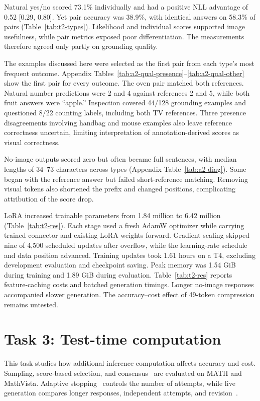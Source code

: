 \documentclass{article}
\begin{document}
Natural yes/no scored 73.1\% individually and had a positive NLL advantage of 0.52 [0.29, 0.80]. Yet pair accuracy was 38.9\%, with identical answers on 58.3\% of pairs (Table~\ref{tab:t2-types}). Likelihood and individual scores supported image usefulness, while pair metrics exposed poor differentiation. The measurements therefore agreed only partly on grounding quality.

The examples discussed here were selected as the first pair from each type's most frequent outcome. Appendix Tables~\ref{tab:a2-qual-presence}--\ref{tab:a2-qual-other} show the first pair for every outcome. The oven pair matched both references. Natural number predictions were 2 and 4 against references 2 and 5, while both fruit answers were ``apple.'' Inspection covered 44/128 grounding examples and questioned 8/22 counting labels, including both TV references. Three presence disagreements involving handbag and mouse examples also leave reference correctness uncertain, limiting interpretation of annotation-derived scores as visual correctness.

No-image outputs scored zero but often became full sentences, with median lengths of 34–73 characters across types (Appendix Table~\ref{tab:a2-diag}). Some began with the reference answer but failed short-reference matching. Removing visual tokens also shortened the prefix and changed positions, complicating attribution of the score drop.

LoRA increased trainable parameters from 1.84 million to 6.42 million (Table~\ref{tab:t2-res}). Each stage used a fresh AdamW optimizer while carrying trained connector and existing LoRA weights forward. Gradient scaling skipped nine of 4,500 scheduled updates after overflow, while the learning-rate schedule and data position advanced. Training updates took 1.61 hours on a T4, excluding development evaluation and checkpoint saving. Peak memory was 1.54 GiB during training and 1.89 GiB during evaluation. Table~\ref{tab:t2-res} reports feature-caching costs and batched generation timings. Longer no-image responses accompanied slower generation. The accuracy–cost effect of 49-token compression remains untested.

\section{Task 3: Test-time computation}
This task studies how additional inference computation affects accuracy and cost. Sampling, score-based selection, and consensus~\citep{wang2022sc} are evaluated on MATH and MathVista. Adaptive stopping~\citep{aggarwal2023adaptive} controls the number of attempts, while live generation compares longer responses, independent attempts, and revision~\citep{madaan2023selfrefine}.
\end{document}

